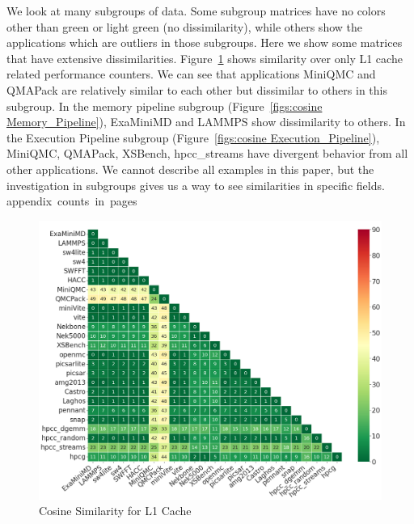 We look at many subgroups of data. Some subgroup matrices have no colors other than green or light green (no dissimilarity), while others show the applications which are outliers in those subgroups. Here we show some matrices that have extensive dissimilarities. Figure~\ref{figs:cosine L1_D_Cache} shows similarity over only L1 cache related performance counters. We can see that applications MiniQMC and QMAPack are relatively
similar to each other but dissimilar to others in this subgroup. In the memory pipeline subgroup (Figure~\ref{figs:cosine Memory_Pipeline}), ExaMiniMD and LAMMPS show dissimilarity to others. In the Execution Pipeline subgroup (Figure~\ref{figs:cosine Execution_Pipeline}), MiniQMC, QMAPack, XSBench, hpcc\_streams have divergent behavior from all
other applications.
We cannot describe all examples in this paper, but the investigation in subgroups gives us a way to see similarities in specific fields. \si{appendix counts in pages}

\begin{figure}[ht]
\centering
\includegraphics[width=0.9\linewidth]{figs/L1_Cache_font20.png}
\caption{Cosine Similarity for L1 Cache }
\label{figs:cosine L1_D_Cache}
\end{figure}


